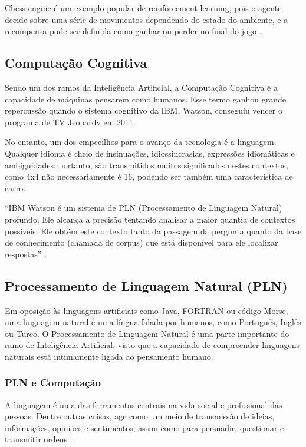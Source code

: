 \documentclass[
	12pt,				%
	openright,			%
	oneside,			%
	a4paper,			%
	english,			%
	spanish,			%
	brazil				%
	]{abntex2}
\begin{document}
		Chess engine é um exemplo popular de reinforcement learning, pois o agente decide sobre uma série de movimentos dependendo do estado do ambiente, e a recompensa pode ser definida como ganhar ou perder no final do jogo \cite{r_julian_heart}.  %
	
	
	\subsection{Computação Cognitiva}

	Sendo um dos ramos da Inteligência Artificial, a Computação Cognitiva é a capacidade de máquinas pensarem como humanos. Esse termo ganhou grande repercussão quando o sistema cognitivo da IBM, Watson, conseguiu vencer o programa de TV Jeopardy em 2011.

	No entanto, um dos empecilhos para o avanço da tecnologia é a linguagem. Qualquer idioma é cheio de insinuações, idiossincrasias, expressões idiomáticas e ambiguidades; portanto, são transmitidos muitos significados nestes contextos, como 4x4 não necessariamente é 16, podendo ser também uma característica de carro.

	``IBM Watson é um sistema de PLN (Processamento de Linguagem Natural) profundo. Ele alcança a precisão tentando analisar a maior quantia de contextos possíveis. Ele obtém este contexto tanto da passagem da pergunta quanto da base de conhecimento (chamada de corpus) que está disponível para ele localizar respostas'' \cite{watson_manual}. 

	\subsection{Processamento de Linguagem Natural (PLN)}
	Em oposição às linguagens artificiais como Java, FORTRAN ou código Morse, uma linguagem natural é uma língua falada por humanos, como Português, Inglês ou Turco. O Processamento de Linguagem Natural é uma parte importante do ramo de Inteligência Artificial, visto que a capacidade de compreender linguagens naturais está intimamente ligada ao pensamento humano. %
	
		\subsubsection*{PLN e Computação}
		A linguagem é uma das ferramentas centrais na vida social e profissional das pessoas. Dentre outras coisas, age como um meio de transmissão de ideias, informações, opiniões e sentimentos, assim como para persuadir, questionar e transmitir ordens \cite{book_natural_lang}.
		
\end{document}
